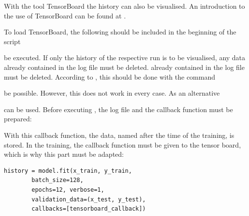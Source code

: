 With the tool TensorBoard the history can also be visualised. An introduction to the use of TensorBoard can be found at \cite{TensorFlow.30.10.2020}.

To load TensorBoard, the following should be included in the beginning of the script

\medskip


\medskip

be executed. If only the history of the respective run is to be visualised, any data already contained in the log file must be deleted.
already contained in the log file must be deleted. According to \cite{TensorFlow.30.10.2020}, this should be done with the command

\medskip


\medskip

be possible. However, this does not work in every case. As an alternative 

\medskip



\medskip

can be used. Before executing , the log file and the callback function must be prepared:

\medskip




\medskip

With this callback function, the data, named after the time of the training, is stored. In the training, the callback function must be given to the tensor board, which is why this part must be adapted:


\begin{code}
    \begin{lstlisting}[numbers=none]
        history = model.fit(x_train, y_train,
        batch_size=128,
        epochs=12, verbose=1,
        validation_data=(x_test, y_test),
        callbacks=[tensorboard_callback])
    \end{lstlisting}
    
    \caption{Carrying out the training with a callback function}
\end{code}


